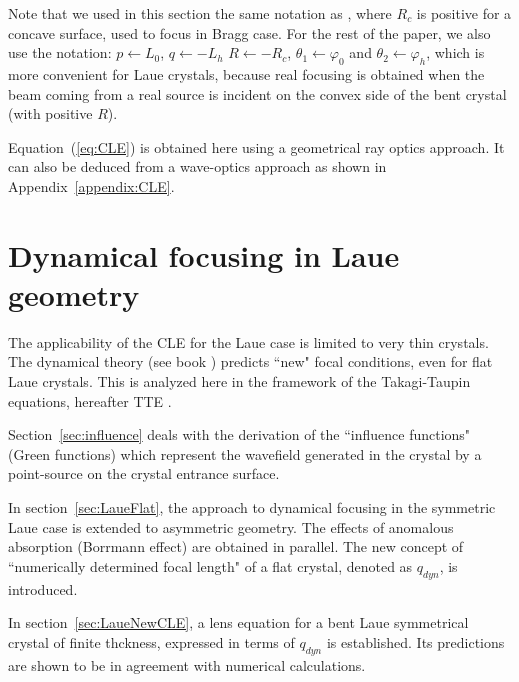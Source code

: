 \documentclass[preprint]{iucr}              %
\begin{document}
Note that we used in this section the same notation as \cite{CK}, where $R_c$ is positive for a concave surface, used to focus in Bragg case. For the rest of the paper, we also use the notation: $p \leftarrow L_0$, $q \leftarrow -L_h$ $R \leftarrow -R_c$, $\theta_1 \leftarrow \varphi_0$ and $\theta_2 \leftarrow \varphi_h$, which is more convenient for Laue crystals, because real focusing is obtained when the beam coming from a real source is incident on the convex side of the bent crystal (with positive $R$).

Equation~(\ref{eq:CLE}) is obtained here using a geometrical ray optics approach. It can also be deduced from a wave-optics approach as shown in Appendix~\ref{appendix:CLE}.

\section{Dynamical focusing in Laue geometry}
\label{sec:dynamlicalLaue}

The applicability of the CLE for the Laue case is limited to very thin crystals. The dynamical theory (see book \cite{authierbook})
predicts ``new" focal conditions, even for flat Laue crystals.
This is analyzed here in the framework of the Takagi-Taupin equations, hereafter TTE \cite{Takagi1962, Takagi, Taupin, Taupin1967}. 

Section~\ref{sec:influence} deals with the derivation of the ``influence functions" (Green functions) which represent the wavefield generated in the crystal by a point-source on the crystal entrance surface.

In section~\ref{sec:LaueFlat}, the approach to dynamical focusing in the symmetric Laue case
\cite{kushnir, GuigayFerrero2013}
is extended to asymmetric geometry. The effects of anomalous absorption (Borrmann effect) are obtained in parallel. The new concept of ``numerically determined focal length" of a flat crystal, denoted as $q_{dyn}$, is introduced.

In section~\ref{sec:LaueNewCLE}, a lens equation for a bent Laue symmetrical crystal of finite thckness, expressed in terms of $q_{dyn}$ is established. Its predictions are shown to be in agreement with numerical calculations. 
\end{document}
